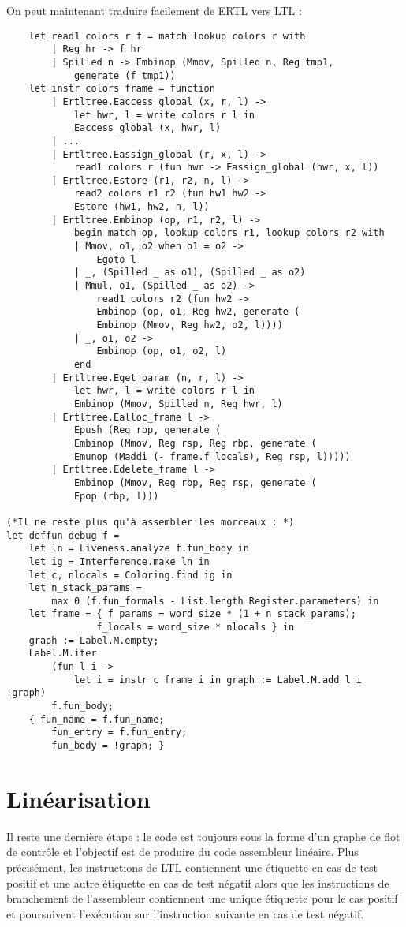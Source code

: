 \documentclass{cours}
\begin{document}
On peut maintenant traduire facilement de ERTL vers LTL :
\begin{verbatim}
    let read1 colors r f = match lookup colors r with
        | Reg hr -> f hr
        | Spilled n -> Embinop (Mmov, Spilled n, Reg tmp1,
            generate (f tmp1))
    let instr colors frame = function
        | Ertltree.Eaccess_global (x, r, l) ->
            let hwr, l = write colors r l in
            Eaccess_global (x, hwr, l)
        | ...
        | Ertltree.Eassign_global (r, x, l) ->
            read1 colors r (fun hwr -> Eassign_global (hwr, x, l))
        | Ertltree.Estore (r1, r2, n, l) ->
            read2 colors r1 r2 (fun hw1 hw2 ->
            Estore (hw1, hw2, n, l))
        | Ertltree.Embinop (op, r1, r2, l) ->
            begin match op, lookup colors r1, lookup colors r2 with
            | Mmov, o1, o2 when o1 = o2 ->
                Egoto l
            | _, (Spilled _ as o1), (Spilled _ as o2)
            | Mmul, o1, (Spilled _ as o2) ->
                read1 colors r2 (fun hw2 ->
                Embinop (op, o1, Reg hw2, generate (
                Embinop (Mmov, Reg hw2, o2, l))))
            | _, o1, o2 ->
                Embinop (op, o1, o2, l)
            end
        | Ertltree.Eget_param (n, r, l) ->
            let hwr, l = write colors r l in
            Embinop (Mmov, Spilled n, Reg hwr, l)
        | Ertltree.Ealloc_frame l ->
            Epush (Reg rbp, generate (
            Embinop (Mmov, Reg rsp, Reg rbp, generate (
            Emunop (Maddi (- frame.f_locals), Reg rsp, l)))))
        | Ertltree.Edelete_frame l ->
            Embinop (Mmov, Reg rbp, Reg rsp, generate (
            Epop (rbp, l)))

(*Il ne reste plus qu'à assembler les morceaux : *)
let deffun debug f =
    let ln = Liveness.analyze f.fun_body in
    let ig = Interference.make ln in
    let c, nlocals = Coloring.find ig in
    let n_stack_params =
        max 0 (f.fun_formals - List.length Register.parameters) in
    let frame = { f_params = word_size * (1 + n_stack_params);
                f_locals = word_size * nlocals } in
    graph := Label.M.empty;
    Label.M.iter
        (fun l i ->
            let i = instr c frame i in graph := Label.M.add l i !graph)
        f.fun_body;
    { fun_name = f.fun_name;
        fun_entry = f.fun_entry;
        fun_body = !graph; }
\end{verbatim}

\section{Linéarisation}
Il reste une dernière étape : le code est toujours sous la forme d'un graphe de flot de contrôle et l'objectif est de produire du code assembleur linéaire. Plus précisément, les instructions de LTL contiennent une étiquette en cas de test positif et une autre étiquette en cas de test négatif alors que les instructions de branchement de l'assembleur contiennent une unique étiquette pour le cas positif et poursuivent l'exécution sur l'instruction suivante en cas de test négatif.
\end{document}
